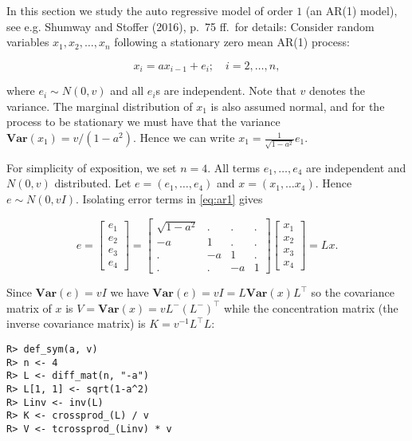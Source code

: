 In this section we study the auto regressive model of order \(1\) (an AR(1) model), see
e.g. Shumway and Stoﬀer (2016), p.~75 ff.~for details:
Consider random variables \(x_1, x_2, \dots, x_n\) following a stationary zero mean AR(1) process:

\begin{equation}
  x_i = a x_{i-1} + e_i; \quad i=2, \dots, n,
  \label{eq:ar1}
\end{equation}

where \(e_i \sim N(0, v)\) and all \(e_i\)s are independent. Note that \(v\) denotes the variance.
The marginal distribution of \(x_1\) is also assumed normal, and for the process to be stationary
we must have that the variance \(\mathbf{Var}(x_1) = v / (1-a^2)\).
Hence we can write \(x_1 = \frac 1 {\sqrt{1-a^2}} e_1\).

For simplicity of exposition, we set \(n=4\). All terms \(e_1, \dots, e_4\) are independent and \(N(0, v)\) distributed. Let \(e=(e_1, \dots, e_4)\) and \(x=(x_1, \dots x_4)\). Hence \(e \sim N(0, v I)\). Isolating
error terms in \eqref{eq:ar1} gives

\[
  e= \left[\begin{matrix}e_{1}\\e_{2}\\e_{3}\\e_{4}\end{matrix}\right] = \left[\begin{matrix}\sqrt{1 - a^{2}} & . & . & .\\- a & 1 & . & .\\. & - a & 1 & .\\. & . & - a & 1\end{matrix}\right] \left[\begin{matrix}x_{1}\\x_{2}\\x_{3}\\x_{4}\end{matrix}\right] = L x  .
\]

Since
\(\mathbf{Var}(e)=v I\) we have \(\mathbf{Var}(e)=v I=L \mathbf{Var}(x) L^\top\) so the covariance matrix of \(x\) is \(V=\mathbf{Var}(x) = v L^- (L^-)^\top\) while the concentration matrix (the inverse covariance
matrix) is \(K=v^{-1}L^\top L\):

\begin{verbatim}
R> def_sym(a, v)
R> n <- 4
R> L <- diff_mat(n, "-a")
R> L[1, 1] <- sqrt(1-a^2)
R> Linv <- inv(L)
R> K <- crossprod_(L) / v
R> V <- tcrossprod_(Linv) * v
\end{verbatim}


